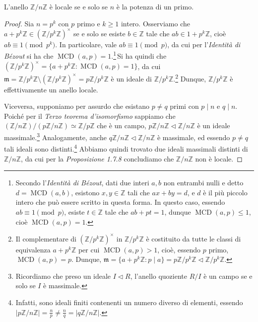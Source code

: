 \begin{prop}[1.7.9]{}
L'anello $\mathbb{Z}/n\mathbb{Z}$ è locale se e solo se $n$ è la potenza di un primo.
\end{prop}
\vspace{-4mm}
\begin{proof}
Sia $n=p^k$ con $p$ primo e $k\geq 1$ intero. Osserviamo che $a+p^k\mathbb{Z}\in (\mathbb{Z}/p^k\mathbb{Z})^{\times}$ se e solo se esiste $b\in \mathbb{Z}$ tale che $ab\in 1+p^k\mathbb{Z}$, cioè $ab\equiv 1 \pmod{p^k}$. In particolare, vale $ab\equiv 1\pmod{p}$, da cui per l'\emph{Identità di Bézout} si ha che $\operatorname{MCD}(a,p)=1$.\footnote{Secondo l'\emph{Identità di Bézout}, dati due interi $a,b$ non entrambi nulli e detto $d=\operatorname{MCD}(a,b)$, esistono $x,y\in \mathbb{Z}$ tali che $ax+by=d$, e $d$ è il più piccolo intero che può essere scritto in questa forma. In questo caso, essendo $ab\equiv 1\pmod{p}$, esiste $t\in \mathbb{Z}$ tale che $ab+pt=1$, dunque $\operatorname{MCD}(a,p)\leq 1$, cioè $\operatorname{MCD}(a,p)=1$.}\,Si ha quindi che $(\mathbb{Z}/p^k\mathbb{Z})^{\times}=\{a+p^k\mathbb{Z}: \operatorname{MCD}(a,p)=1\}$, da cui $\mathfrak{m}=\mathbb{Z}/p^k\mathbb{Z}\setminus (\mathbb{Z}/p^k\mathbb{Z})^{\times}=p\mathbb{Z}/p^k\mathbb{Z}$ è un ideale di $\mathbb{Z}/p^k\mathbb{Z}$.\footnote{Il complementare di $(\mathbb{Z}/p^k\mathbb{Z})^{\times}$ in $\mathbb{Z}/p^k\mathbb{Z}$ è costituito da tutte le classi di equivalenza $a+p^k\mathbb{Z}$ per cui $\operatorname{MCD}(a,p)>1$, cioè, essendo $p$ primo, $\operatorname{MCD}(a,p)=p$. Dunque, $\mathfrak{m}=\{a+p^k\mathbb{Z}: p\mid a\}=p\mathbb{Z}/p^k\mathbb{Z}\lhd \mathbb{Z}/p^k\mathbb{Z}$.} Dunque, $\mathbb{Z}/p^k\mathbb{Z}$ è effettivamente un anello locale.

Viceversa, supponiamo per assurdo che esistano $p\neq q$ primi con $p\mid n$ e $q \mid n$. Poiché per il \emph{Terzo teorema d'isomorfismo} sappiamo che $(\mathbb{Z}/n\mathbb{Z})/(p\mathbb{Z}/n\mathbb{Z})\simeq \mathbb{Z}/p\mathbb{Z}$ che è un campo, $p\mathbb{Z}/n\mathbb{Z}\lhd \mathbb{Z}/n\mathbb{Z}$ è un ideale massimale.\footnote{Ricordiamo che preso un ideale $I\lhd R$, l'anello quoziente $R/I$ è un campo se e solo se $I$ è massimale.} Analogamente, anche $q\mathbb{Z}/n\mathbb{Z}\lhd \mathbb{Z}/n\mathbb{Z}$ è massimale, ed essendo $p\neq q$ tali ideali sono distinti.\footnote{Infatti, sono ideali finiti contenenti un numero diverso di elementi, essendo $|p\mathbb{Z}/n\mathbb{Z}|=\frac{n}{p}\neq \frac{n}{q}=|q\mathbb{Z}/n\mathbb{Z}|$.} Abbiamo quindi trovato due ideali massimali distinti di $\mathbb{Z}/n\mathbb{Z}$, da cui per la \emph{Proposizione 1.7.8} concludiamo che $\mathbb{Z}/n\mathbb{Z}$ non è locale.
\end{proof}

